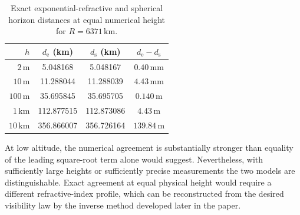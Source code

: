 \begin{table}[ht]
    \centering
    \begin{tabular}{rccc}
        \hline
        $h$ & $d_{\mathrm{e}}$ (km) & $d_{\mathrm{s}}$ (km)
            & $d_{\mathrm{e}}-d_{\mathrm{s}}$ \\
        \hline
        $2\,\mathrm{m}$   & 5.048168 & 5.048167 & $0.40\,\mathrm{mm}$ \\
        $10\,\mathrm{m}$  & 11.288044 & 11.288039 & $4.43\,\mathrm{mm}$ \\
        $100\,\mathrm{m}$ & 35.695845 & 35.695705 & $0.140\,\mathrm{m}$ \\
        $1\,\mathrm{km}$  & 112.877515 & 112.873086 & $4.43\,\mathrm{m}$ \\
        $10\,\mathrm{km}$ & 356.866007 & 356.726164 & $139.84\,\mathrm{m}$ \\
        \hline
    \end{tabular}
    \caption{Exact exponential-refractive and spherical horizon distances at
    equal numerical height for $R=6371\,\mathrm{km}$.}
    \label{tab:horizon-law-comparison}
\end{table}

At low altitude, the numerical agreement is substantially stronger than
equality of the leading square-root term alone would suggest. Nevertheless,
with sufficiently large heights or sufficiently precise measurements the two
models are distinguishable. Exact agreement at equal physical height would
require a different refractive-index profile, which can be reconstructed from
the desired visibility law by the inverse method developed later in the
paper.
